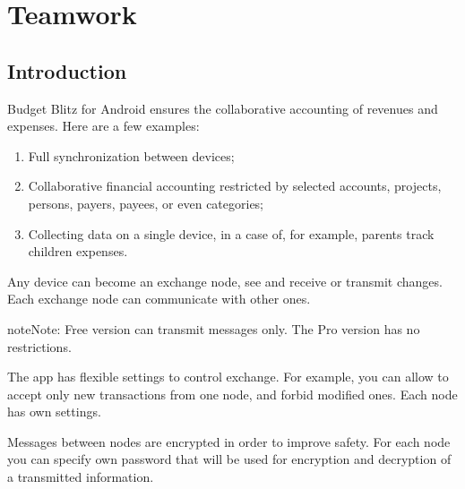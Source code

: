 \documentclass[a4paper,10pt,english]{sphinxmanual}
\begin{document}
\noindent{}

\noindent{}


\chapter{Teamwork}
\label{\detokenize{teamwork:teamwork}}\label{\detokenize{teamwork:chapter-teamwork}}\label{\detokenize{teamwork::doc}}

\section{Introduction}
\label{\detokenize{teamwork:introduction}}
Budget Blitz for Android ensures the collaborative accounting of revenues and expenses. Here are a few examples:
\begin{enumerate}
\def\theenumi{\arabic{enumi}}
\def\labelenumi{\theenumi .}
\makeatletter\def\p@enumii{\p@enumi \theenumi .}\makeatother
\item {} 
Full synchronization between devices;

\item {} 
Collaborative financial accounting restricted by selected accounts, projects, persons, payers, payees, or even categories;

\item {} 
Collecting data on a single device, in a case of, for example, parents track children expenses.

\end{enumerate}

Any device can become an exchange node, see {\hyperref[\detokenize{glossary:term-exchange-node}]{}} and receive or transmit changes.
Each exchange node can communicate with other ones.

\begin{sphinxadmonition}{note}{Note:}
Free version can transmit messages only. The Pro version has no restrictions.
\end{sphinxadmonition}

The app has flexible settings to control exchange. For example, you can allow to accept only new transactions
from one node, and forbid modified ones. Each node has own settings.

Messages between nodes are encrypted in order to improve safety. For each node you can specify
own password that will be used for encryption and decryption of a transmitted information.
\end{document}
